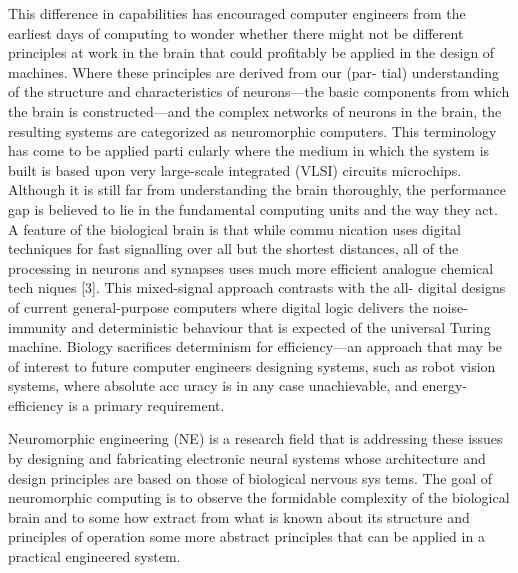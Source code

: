 This difference in capabilities has encouraged computer
engineers from the earliest days of computing to wonder
whether there might not be different principles at work in the
brain that could profitably be applied in the design of
machines. Where these principles are derived from our (par-
tial) understanding of the structure and characteristics of
neurons—the basic components from which the brain is
constructed—and the complex networks of neurons in the
brain, the resulting systems are categorized as neuromorphic
computers. This terminology has come to be applied parti
cularly where the medium in which the system is built is
based upon very large-scale integrated (VLSI) circuits microchips.
Although it is still far from understanding the brain thoroughly, the performance gap is believed to lie in the fundamental computing units and the way they act.
A feature of the biological brain is that while commu
nication uses digital techniques for fast signalling over all but
the shortest distances, all of the processing in neurons and
synapses uses much more efficient analogue chemical tech
niques [3]. This mixed-signal approach contrasts with the all-
digital designs of current general-purpose computers where
digital logic delivers the noise-immunity and deterministic
behaviour that is expected of the universal Turing machine.
Biology sacrifices determinism for efficiency—an approach
that may be of interest to future computer engineers designing
systems, such as robot vision systems, where absolute acc
uracy is in any case unachievable, and energy-efficiency is a
primary requirement.

Neuromorphic engineering (NE) is a research field that
is addressing these issues by designing and fabricating
electronic neural systems whose architecture and design
principles are based on those of biological nervous sys
tems.
The goal of neuromorphic computing is to observe the
formidable complexity of the biological brain and to some
how extract from what is known about its structure and
principles of operation some more abstract principles that can
be applied in a practical engineered system.



